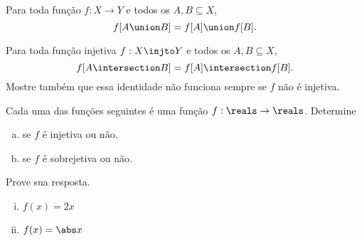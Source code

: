 \begin{exercise}
	Para toda função $f : X \to Y$ e todos os $A, B \subseteq X$,
	$$
		f[A \union B] = f[A] \union f[B].
	$$
\end{exercise}

\begin{exercise}
	Para toda função injetiva $f : X \injto Y$ e todos os $A, B \subseteq X$,
	$$
		f[A \intersection B] = f[A] \intersection f[B].
	$$
	Mostre também que essa identidade não funciona sempre se $f$ não é injetiva.
\end{exercise}

\begin{exercise}
	Cada uma das funções seguintes é uma função $f : \reals\to\reals$. Determine
	\begin{enumerate}[(a)]
		\item se $f$ é injetiva ou não.
		\item se $f$ é sobrejetiva ou não.
	\end{enumerate}
	Prove sua resposta.
	\begin{enumerate}[(i)]
		\item $f(x) = 2x$
		\item $f(x) = \abs x$
	\end{enumerate}
\end{exercise}

